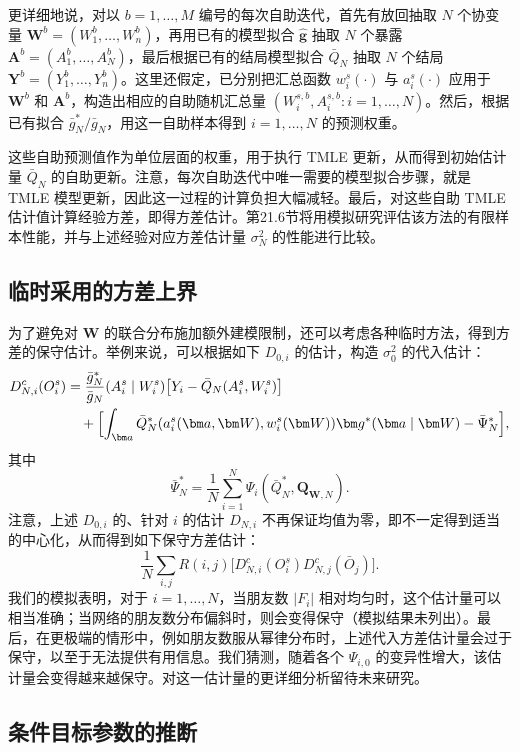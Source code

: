 更详细地说，对以 $b=1,\ldots,M$ 编号的每次自助迭代，首先有放回抽取 $N$ 个协变量 $\bm W^b=(W_1^b,\ldots,W_n^b)$，再用已有的模型拟合 $\hat{\bm g}$ 抽取 $N$ 个暴露 $\bm A^b=(A_1^b,\ldots,A_N^b)$，最后根据已有的结局模型拟合 $\bar Q_N$ 抽取 $N$ 个结局 $\bm Y^b=(Y_1^b,\ldots,Y_n^b)$。这里还假定，已分别把汇总函数 $w_i^s(\cdot)$ 与 $a_i^s(\cdot)$ 应用于 $\bm W^b$ 和 $\bm A^b$，构造出相应的自助随机汇总量 $(W_i^{s,b},A_i^{s,b}:i=1,\ldots,N)$。然后，根据已有拟合 $\bar g_N^*/\bar g_N$，用这一自助样本得到 $i=1,\ldots,N$ 的预测权重。

这些自助预测值作为单位层面的权重，用于执行 TMLE 更新，从而得到初始估计量 $\bar Q_N$ 的自助更新。注意，每次自助迭代中唯一需要的模型拟合步骤，就是 TMLE 模型更新，因此这一过程的计算负担大幅减轻。最后，对这些自助 TMLE 估计值计算经验方差，即得方差估计。第21.6节将用模拟研究评估该方法的有限样本性能，并与上述经验对应方差估计量 $\sigma_N^2$ 的性能进行比较。

\subsection{临时采用的方差上界}

为了避免对 $\bm W$ 的联合分布施加额外建模限制，还可以考虑各种临时方法，得到方差的保守估计。举例来说，可以根据如下 $D_{0,i}$ 的估计，构造 $\sigma_0^2$ 的代入估计：
\[
 \begin{aligned}
 D_{N,i}^c(O_i^s)
 &=\frac{\bar g_N^*}{\bar g_N}(A_i^s\mid W_i^s)
   \bigl[Y_i-\bar Q_N(A_i^s,W_i^s)\bigr]\\
 &\quad+\Bigl[\int_{\bm a}
 \bar Q_N^*(a_i^s(\bm a,\bm W),w_i^s(\bm W))
 \bm g^*(\bm a\mid\bm W)-\bar\Psi_N^*\Bigr],
 \end{aligned}
\]
其中
\[
 \bar\Psi_N^*=\frac{1}{N}\sum_{i=1}^N\Psi_i(\bar Q_N^*,\bm Q_{\bm W,N}).
\]
注意，上述 $D_{0,i}$ 的、针对 $i$ 的估计 $D_{N,i}$ 不再保证均值为零，即不一定得到适当的中心化，从而得到如下保守方差估计：
\[
 \frac{1}{N}\sum_{i,j}R(i,j)
 \bigl[D_{N,i}^c(O_i^s)D_{N,j}^c(\bar O_j)\bigr].
\]
我们的模拟表明，对于 $i=1,\ldots,N$，当朋友数 $|F_i|$ 相对均匀时，这个估计量可以相当准确；当网络的朋友数分布偏斜时，则会变得保守（模拟结果未列出）。最后，在更极端的情形中，例如朋友数服从幂律分布时，上述代入方差估计量会过于保守，以至于无法提供有用信息。我们猜测，随着各个 $\Psi_{i,0}$ 的变异性增大，该估计量会变得越来越保守。对这一估计量的更详细分析留待未来研究。

\subsection{条件目标参数的推断}

